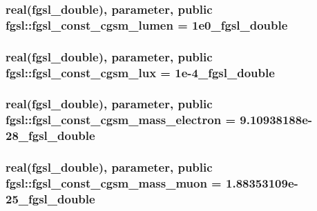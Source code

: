 \hypertarget{classfgsl_a754f063aac1363ab86693605311aeaf8}{
\subsubsection[{fgsl\-\_\-const\-\_\-cgsm\-\_\-lumen}]{\setlength{\rightskip}{0pt plus 5cm}real({\bf fgsl\-\_\-double}), parameter, public fgsl\-::fgsl\-\_\-const\-\_\-cgsm\-\_\-lumen = 1e0\-\_\-fgsl\-\_\-double}}\label{classfgsl_a754f063aac1363ab86693605311aeaf8}
\hypertarget{classfgsl_aba54a122b0e64f01ac54513a4a0f6a9f}{
\subsubsection[{fgsl\-\_\-const\-\_\-cgsm\-\_\-lux}]{\setlength{\rightskip}{0pt plus 5cm}real({\bf fgsl\-\_\-double}), parameter, public fgsl\-::fgsl\-\_\-const\-\_\-cgsm\-\_\-lux = 1e-\/4\-\_\-fgsl\-\_\-double}}\label{classfgsl_aba54a122b0e64f01ac54513a4a0f6a9f}
\hypertarget{classfgsl_a8b5c993b964f03b76098558c24095fd4}{
\subsubsection[{fgsl\-\_\-const\-\_\-cgsm\-\_\-mass\-\_\-electron}]{\setlength{\rightskip}{0pt plus 5cm}real({\bf fgsl\-\_\-double}), parameter, public fgsl\-::fgsl\-\_\-const\-\_\-cgsm\-\_\-mass\-\_\-electron = 9.\-10938188e-\/28\-\_\-fgsl\-\_\-double}}\label{classfgsl_a8b5c993b964f03b76098558c24095fd4}
\hypertarget{classfgsl_a3092e1888259499b77e1dc358db86c58}{
\subsubsection[{fgsl\-\_\-const\-\_\-cgsm\-\_\-mass\-\_\-muon}]{\setlength{\rightskip}{0pt plus 5cm}real({\bf fgsl\-\_\-double}), parameter, public fgsl\-::fgsl\-\_\-const\-\_\-cgsm\-\_\-mass\-\_\-muon = 1.\-88353109e-\/25\-\_\-fgsl\-\_\-double}}\label{classfgsl_a3092e1888259499b77e1dc358db86c58}
